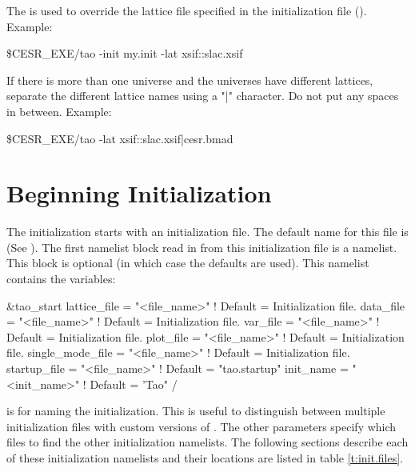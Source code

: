 The  is used to override the 
lattice file specified in the initialization file
(). Example:
\begin{example}
  \$CESR_EXE/tao -init my.init -lat xsif::slac.xsif
\end{example}
If there is more than one universe and the universes have different
lattices, separate the different lattice names using a "|" character.
Do not put any spaces in between. Example:
\begin{example}
  \$CESR_EXE/tao -lat xsif::slac.xsif|cesr.bmad
\end{example}

\section{Beginning Initialization}
\label{s:init.global} 

The initialization starts with an initialization file. The default name for
this file is  (See ).
The first namelist block read in from this initialization file is a 
 namelist. This block is optional (in which case the defaults
are used).  This namelist contains the variables:
\begin{example}
  &tao_start
    lattice_file      = "<file_name>"  ! Default = Initialization file.
    data_file         = "<file_name>"  ! Default = Initialization file.
    var_file          = "<file_name>"  ! Default = Initialization file.
    plot_file         = "<file_name>"  ! Default = Initialization file.
    single_mode_file  = "<file_name>"  ! Default = Initialization file.
    startup_file      = "<file_name>"  ! Default = "tao.startup"
    init_name         = "<init_name>"  ! Default = 'Tao"
  /
\end{example}
 is for naming the initialization. This is useful to
distinguish between multiple initialization files with custom versions
of \tao. The other parameters specify which files to find the other
initialization namelists. The following sections describe each of
these initialization namelists and their locations are listed in table
\ref{t:init.files}.

